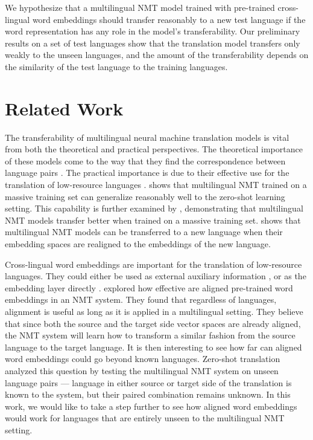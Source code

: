 \documentclass[11pt,a4paper]{article}
\begin{document}
We hypothesize that a multilingual NMT model trained with pre-trained cross-lingual word embeddings should transfer reasonably to a new test language if the word representation has any role in the model's transferability.
Our preliminary results on a set of test languages show that the translation model transfers only weakly to the unseen languages, and the amount of the transferability depends on the similarity of the test language to the training languages.

\section{Related Work}
The transferability of multilingual neural machine translation models is vital from both the theoretical and practical perspectives.
The theoretical importance of these models come to the way that they find the correspondence between language pairs \citep{Johnson:2016aa,lu-etal-2018-neural}.
The practical importance is due to their effective use for the translation of low-resource languages \citep{Zoph:2016aa,Nguyen:2017aa}.
\citet{Johnson:2016aa} shows that multilingual NMT trained on a massive training set can generalize reasonably well to the zero-shot learning setting.
This capability is further examined by \citet{aharoni-etal-2019-massively}, demonstrating that multilingual NMT models transfer better when trained on a massive training set.
\citet{Kim:2019aa} shows that multilingual NMT models can be transferred to a new language when their embedding spaces are realigned to the embeddings of the new language.

Cross-lingual word embeddings are important for the translation of low-resource languages.
They could either be used as external auxiliary information \cite{Conneau:2017aa, Lakew:2019aa}, or as the embedding layer directly \cite{neishi-etal-2017-bag,artetxe-etal-2017-learning}.
\citet{Qi:2018aa} explored how effective are aligned pre-trained word embeddings in an NMT system.
They found that regardless of languages, alignment is useful as long as it is applied in a multilingual setting.
They believe that since both the source and the target side vector spaces are already aligned, the NMT system will learn how to transform a similar fashion from the source language to the target language.
It is then interesting to see how far can aligned word embeddings could go beyond known languages.
Zero-shot translation analyzed this question by testing the multilingual NMT system on unseen language pairs --- language in either source or target side of the translation is known to the system, but their paired combination remains unknown.
In this work, we would like to take a step further to see how aligned word embeddings would work for languages that are entirely unseen to the multilingual NMT setting.
\end{document}
